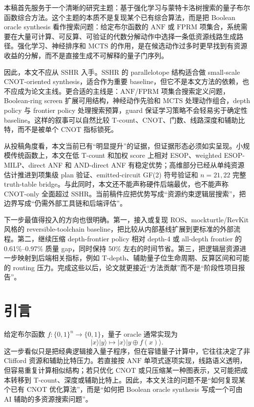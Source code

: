 \documentclass[UTF8,fontset=macnew,11pt]{ctexart}
\newcommand{\anf}{\ensuremath{\mathrm{ANF}}}
\newcommand{\fprm}{\ensuremath{\mathrm{FPRM}}}
\newcommand{\mcts}{\ensuremath{\mathrm{MCTS}}}
\newcommand{\xor}{\ensuremath{\oplus}}
\newcommand{\ttable}{truth-table}
\begin{document}
本稿首先服务于一个清晰的研究主题：基于强化学习与蒙特卡洛树搜索的量子布尔函数综合方法。这个主题的本质不是复现某个已有综合算法，而是把 Boolean oracle synthesis 看作搜索问题：给定布尔函数的 \anf{} 或 \fprm{} 项集合，系统需要在大量可计算、可反算、可验证的代数分解动作中选择一条低资源线路生成路径。强化学习、神经排序和 \mcts{} 的作用，是在候选动作过多时更早找到有资源收益的分解，而不是直接生成不可解释的量子门序列。

因此，本文不应从 SSHR 入手。SSHR 的 parallelotope 结构适合做 small-scale CNOT-oriented synthesis，适合作为重要 baseline，但它不是本文方法的依赖，也不应成为论文主线。更合适的主线是：\anf{}/\fprm{} 项集合搜索定义问题，Boolean-ring screen 扩展可用结构，神经动作先验和 \mcts{} 处理动作组合，depth policy 与 frontier policy 处理搜索预算，guard 保证学习策略不会轻易劣于确定性 baseline。这样的叙事可以自然比较 T-count、CNOT、门数、线路深度和辅助比特，而不是被单个 CNOT 指标锁死。

从投稿角度看，本文当前已有“明显提升”的证据，但证据形态必须如实呈现。小规模传统函数上，本文在低 T-count 和加权 score 上相对 ESOP、weighted ESOP-MILP、direct ANF 和 AND-direct ANF 有稳定优势；高维部分已经从单纯资源估计推进到项集级 plan 验证、emitted-circuit GF(2) 符号验证和 $n=21,22$ 完整 \ttable{} bridge。与此同时，本文还不能声称硬件后端最优，也不能声称 CNOT-only 全面超过 SSHR。当前稿件应把优势写成“资源约束逻辑层搜索”，把边界写成“仍需外部工具链和后端评估”。

下一步最值得投入的方向也很明确。第一，接入或复现 ROS、mockturtle/RevKit 风格的 reversible-toolchain baseline，把比较从内部基线扩展到更标准的外部流程。第二，继续压缩 depth-frontier policy 相对 depth-4 或 all-depth frontier 的 0.61\%--0.97\% 质量 gap，同时保持 50\% 左右的时间节省。第三，把逻辑层资源进一步映射到后端相关指标，例如 T-depth、辅助量子位生命周期、反算区间和可能的 routing 压力。完成这些以后，论文就更接近“方法贡献”而不是“阶段性项目报告”。

\section{引言}

给定布尔函数 $f:\{0,1\}^n\rightarrow\{0,1\}$，量子 oracle 通常实现为
\begin{equation}
  |x\rangle |y\rangle \mapsto |x\rangle |y\xor f(x)\rangle .
  \label{eq:oracle}
\end{equation}
这一步看似只是把经典逻辑接入量子程序，但在容错量子计算中，它往往决定了非 Clifford 资源和辅助比特压力。若直接按 \anf{} 单项式逐项实现，线路语义透明，但容易重复计算相似结构；若只优化 CNOT 或只压缩某一种图表示，又可能把成本转移到 T-count、深度或辅助比特上。因此，本文关注的问题不是“如何复现某个已有 CNOT 优化算法”，而是“如何把 Boolean oracle synthesis 写成一个可由 AI 辅助的多资源搜索问题”。
\end{document}

